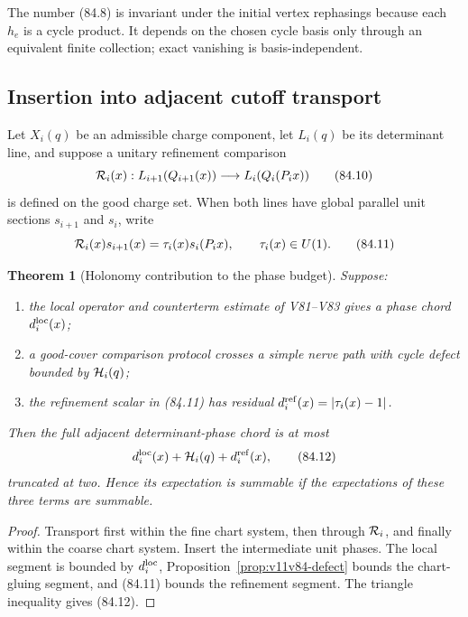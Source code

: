 \documentclass[11pt]{article}
\newtheorem{theorem}{Theorem}[section]
\begin{document}
The number (84.8) is invariant under the initial vertex rephasings
because each \(h_e\) is a cycle product.  It depends on the chosen
cycle basis only through an equivalent finite collection; exact
vanishing is basis-independent.

\subsection{Insertion into adjacent cutoff transport}

Let \(X_i(q)\) be an admissible charge component, let \(L_i(q)\) be
its determinant line, and suppose a unitary refinement comparison
\[
                 {\cal R}_i(x):
                 L_{i+1}(Q_{i+1}(x))
                 \longrightarrow L_i(Q_i(P_ix))             \tag{84.10}
\]
is defined on the good charge set.  When both lines have global
parallel unit sections \(s_{i+1}\) and \(s_i\), write
\[
                 {\cal R}_i(x)s_{i+1}(x)
                    =\tau_i(x)s_i(P_ix),\qquad \tau_i(x)\in U(1).
                                                                    \tag{84.11}
\]

\begin{theorem}[Holonomy contribution to the phase budget]
\label{thm:v11v84-budget}
Suppose:
\begin{enumerate}
\item the local operator and counterterm estimate of V81--V83 gives a
      phase chord \(d_i^{\rm loc}(x)\);
\item a good-cover comparison protocol crosses a simple nerve path
      with cycle defect bounded by \({\cal H}_i(q)\);
\item the refinement scalar in (84.11) has residual
      \(d_i^{\rm ref}(x)=|\tau_i(x)-1|\).
\end{enumerate}
Then the full adjacent determinant-phase chord is at most
\[
             d_i^{\rm loc}(x)+{\cal H}_i(q)
                         +d_i^{\rm ref}(x),                  \tag{84.12}
\]
truncated at two.  Hence its expectation is summable if the
expectations of these three terms are summable.
\end{theorem}

\begin{proof}
Transport first within the fine chart system, then through
\({\cal R}_i\), and finally within the coarse chart system.  Insert
the intermediate unit phases.  The local segment is bounded by
\(d_i^{\rm loc}\), Proposition~\ref{prop:v11v84-defect} bounds the
chart-gluing segment, and (84.11) bounds the refinement segment.
The triangle inequality gives (84.12).
\end{proof}
\end{document}
